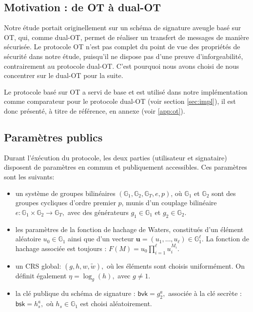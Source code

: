 \documentclass[10pt,a4paper]{article}
\theoremstyle{definition}
\theoremstyle{plain}
\theoremstyle{remark}
\begin{document}
\subsection{Motivation : de OT à dual-OT}

Notre étude portait originellement sur un schéma de signature aveugle 
basé sur OT, qui, comme dual-OT, 
permet de réaliser un transfert de messages de manière sécurisée. 
Le protocole OT n'est pas complet du point de vue des propriétés de sécurité dans notre étude, 
puisqu'il ne dispose pas d'une preuve d'inforgeabilité, contrairement au protocole dual-OT.
C'est pourquoi nous avons choisi de nous concentrer sur le dual-OT pour la suite.

Le protocole basé sur OT a servi de base et est utilisé dans notre implémentation 
comme comparateur pour le protocole dual-OT (voir section \ref{sec:impl}), 
il est donc présenté, à titre de référence, en annexe (voir \ref{app:ot}).

\subsection{Paramètres publics}

Durant l'éxécution du protocole, les deux parties (utilisateur et signataire) disposent de paramètres en commun et publiquement accessibles.
Ces paramètres sont les suivants: 

\begin{itemize}
    \item un système de groupes bilinéaires
    $(\mathbb{G}_1,\mathbb{G}_2,\mathbb{G}_T,e,p)$,
    où $\mathbb{G}_1$ et $\mathbb{G}_2$ sont des groupes cycliques
    d'ordre premier $p$, munis d'un couplage bilinéaire
    $
    e:\mathbb{G}_1\times\mathbb{G}_2\rightarrow\mathbb{G}_T,
    $
    avec des générateurs
    $g_1\in\mathbb{G}_1$ et $g_2\in\mathbb{G}_2$.

    \item les paramètres de la fonction de hachage de Waters,
    constitués d'un élément aléatoire
    $u_0\in\mathbb{G}_1$
    ainsi que d'un vecteur
    $\mathbf{u}=(u_1,\ldots,u_\ell)\in\mathbb{G}_1^\ell$.
    La fonction de hachage associée est toujours :
    $
    F(M)=u_0\prod_{i=1}^{\ell}u_i^{M_i}.
    $

    \item un CRS global:
    $
    (g,h,w,\widetilde{w}),
    $
    où les éléments sont choisis uniformément.
    On définit également
    $
    \eta=\log_g(h),
    $
    avec $g\neq 1$.

    \item la clé publique du schéma de signature :
    $
    \mathsf{bvk}=g_2^a,
    $
    associée à la clé secrète :
    $
    \mathsf{bsk}=h_s^a,
    $
    où $h_s\in\mathbb{G}_1$ est choisi aléatoirement.

\end{itemize}
\end{document}
